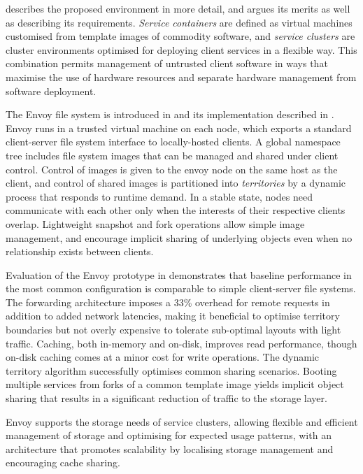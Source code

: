  describes the proposed environment in more detail, and argues its merits as well as describing its requirements. \emph{Service containers} are defined as virtual machines customised from template images of commodity software, and \emph{service clusters} are cluster environments optimised for deploying client services in a flexible way. This combination permits management of untrusted client software in ways that maximise the use of hardware resources and separate hardware management from software deployment.

The Envoy file system is introduced in  and its implementation described in . Envoy runs in a trusted virtual machine on each node, which exports a standard client-server file system interface to locally-hosted clients. A global namespace tree includes file system images that can be managed and shared under client control. Control of images is given to the envoy node on the same host as the client, and control of shared images is partitioned into \emph{territories} by a dynamic process that responds to runtime demand. In a stable state, nodes need communicate with each other only when the interests of their respective clients overlap. Lightweight snapshot and fork operations allow simple image management, and encourage implicit sharing of underlying objects even when no relationship exists between clients.

Evaluation of the Envoy prototype in  demonstrates that baseline performance in the most common configuration is comparable to simple client-server file systems. The forwarding architecture imposes a 33\% overhead for remote requests in addition to added network latencies, making it beneficial to optimise territory boundaries but not overly expensive to tolerate sub-optimal layouts with light traffic. Caching, both in-memory and on-disk, improves read performance, though on-disk caching comes at a minor cost for write operations. The dynamic territory algorithm successfully optimises common sharing scenarios. Booting multiple services from forks of a common template image yields implicit object sharing that results in a significant reduction of traffic to the storage layer.

Envoy supports the storage needs of service clusters, allowing flexible and efficient management of storage and optimising for expected usage patterns, with an architecture that promotes scalability by localising storage management and encouraging cache sharing.
